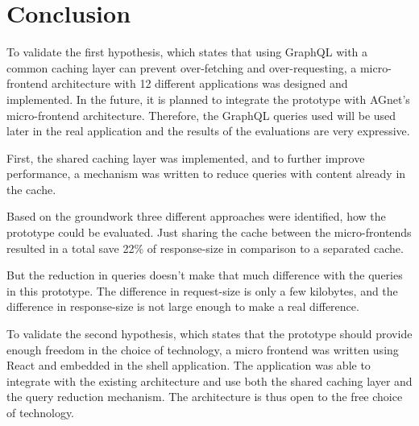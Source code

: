 \chapter{Conclusion}\label{chapter:conclusion}

\noindent To validate the first hypothesis, which states that using GraphQL with a common caching layer can prevent over-fetching and over-requesting, a micro-frontend architecture with 12 different applications was designed and implemented. In the future, it is planned to integrate the prototype with AGnet's micro-frontend architecture. Therefore, the GraphQL queries used will be used later in the real application and the results of the evaluations are very expressive.

\noindent First, the shared caching layer was implemented, and to further improve performance, a mechanism was written to reduce queries with content already in the cache.

\noindent Based on the groundwork three different approaches were identified, how the prototype could be evaluated. Just sharing the cache between the micro-frontends resulted in a total save 22\% of response-size in comparison to a separated cache.

\noindent But the reduction in queries doesn't make that much difference with the queries in this prototype. The difference in request-size is only a few kilobytes, and the difference in response-size is not large enough to make a real difference.

\noindent To validate the second hypothesis, which states that the prototype should provide enough freedom in the choice of technology, a micro frontend was written using React and embedded in the shell application. The application was able to integrate with the existing architecture and use both the shared caching layer and the query reduction mechanism. The architecture is thus open to the free choice of technology.
